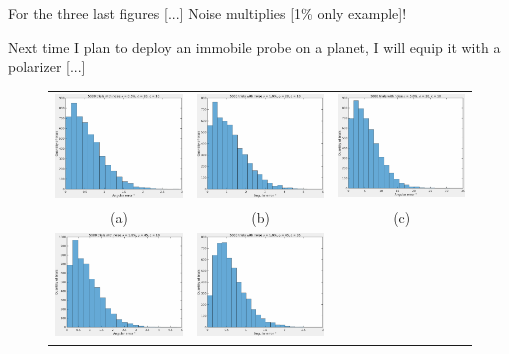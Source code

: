 \documentclass{report}
\begin{document}
For the three last figures [...]
Noise multiplies [1\% only example]!

Next time I plan to deploy an immobile probe on a planet, I will equip it with a polarizer [...]

\begin{figure}
  \centering
  \begin{tabular}{ccc}
  \includegraphics[width=0.30\linewidth]{q4_error_el_20_dev_10_noise_0_005000.pdf} &
  \includegraphics[width=0.30\linewidth]{q4_error_el_20_dev_10_noise_0_010000.pdf} &
  \includegraphics[width=0.30\linewidth]{q4_error_el_20_dev_10_noise_0_050000.pdf} \\
  (a) &
  (b) &
  (c) \\
  \includegraphics[width=0.30\linewidth]{q4_error_el_45_dev_10_noise_0_010000.pdf} &
  \includegraphics[width=0.30\linewidth]{q4_error_el_45_dev_35_noise_0_010000.pdf} &

\end{tabular}
\end{figure}
\end{document}
